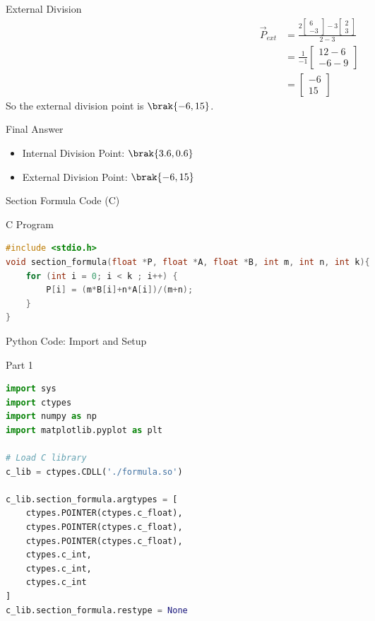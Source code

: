 \documentclass{beamer}
\begin{document}
\begin{frame}{External Division}
\begin{align}
\vec{P}_{ext} &= \frac{2\begin{bmatrix}6\\-3\end{bmatrix}-3\begin{bmatrix}2\\3\end{bmatrix}}{2-3} \\
&= \frac{1}{-1}\begin{bmatrix}12-6 \\ -6-9\end{bmatrix} \\
&= \begin{bmatrix}-6 \\ 15\end{bmatrix}
\end{align}
So the external division point is $\brak{-6,15}$.
\end{frame}

\begin{frame}{Final Answer}
\begin{itemize}
    \item Internal Division Point: $\brak{3.6, 0.6}$
    \item External Division Point: $\brak{-6, 15}$
\end{itemize}
\end{frame}

\begin{frame}[fragile]{Section Formula Code (C)}
\begin{block}{C Program}
\begin{lstlisting}[language=C, basicstyle=\ttfamily\small, keywordstyle=\color{blue}, frame=single]
#include <stdio.h>
void section_formula(float *P, float *A, float *B, int m, int n, int k){
    for (int i = 0; i < k ; i++) {
        P[i] = (m*B[i]+n*A[i])/(m+n);
    }
}
\end{lstlisting}
\end{block}
\end{frame}


\begin{frame}[fragile]{Python Code: Import and Setup}
\begin{block}{Part 1}
\begin{lstlisting}[language=Python, basicstyle=\ttfamily\small, keywordstyle=\color{blue}, frame=single]
import sys
import ctypes
import numpy as np
import matplotlib.pyplot as plt

# Load C library
c_lib = ctypes.CDLL('./formula.so')

c_lib.section_formula.argtypes = [
    ctypes.POINTER(ctypes.c_float),  
    ctypes.POINTER(ctypes.c_float),  
    ctypes.POINTER(ctypes.c_float),  
    ctypes.c_int,                    
    ctypes.c_int,                    
    ctypes.c_int                     
]
c_lib.section_formula.restype = None  
\end{lstlisting}
\end{block}
\end{frame}
\end{document}
